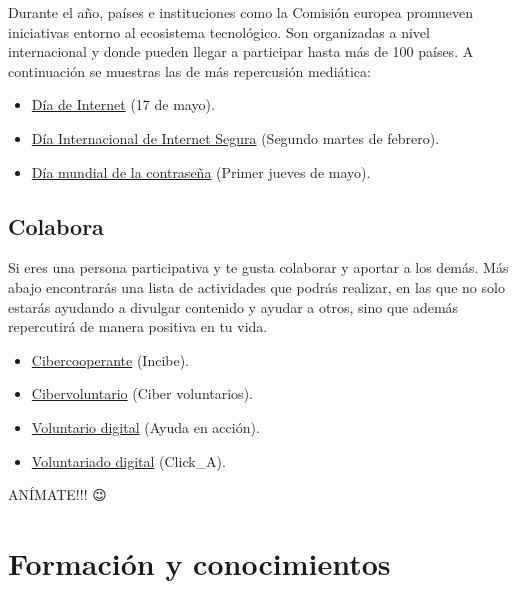 \documentclass[
  spanish,
  a4paper,
  openany]{book}
\begin{document}
Durante el año, países e instituciones como la Comisión europea promueven iniciativas entorno al ecosistema tecnológico. Son organizadas a nivel internacional y donde pueden llegar a participar hasta más de 100 países. A continuación se muestras las de más repercusión mediática:

\begin{itemize}
\item
  \href{https://es.wikipedia.org/wiki/Día_de_Internet}{Día de Internet} (17 de mayo).
\item
  \href{https://es.wikipedia.org/wiki/Día_Internacional_de_Internet_Segura}{Día Internacional de Internet Segura} (Segundo martes de febrero).
\item
  \href{https://es.wikipedia.org/wiki/Día_mundial_de_la_contraseña}{Día mundial de la contraseña} (Primer jueves de mayo).
\end{itemize}

\hypertarget{colabora}{%
\section{Colabora}\label{colabora}}

Si eres una persona participativa y te gusta colaborar y aportar a los demás. Más abajo encontrarás una lista de actividades que podrás realizar, en las que no solo estarás ayudando a divulgar contenido y ayudar a otros, sino que además repercutirá de manera positiva en tu vida.

\begin{itemize}
\item
  \href{https://www.incibe.es/cibercooperantes/quiero-ser-cibercooperante}{Cibercooperante} (Incibe).
\item
  \href{https://www.cibervoluntarios.org/}{Cibervoluntario} (Ciber voluntarios).
\item
  \href{https://ayudaenaccion.org/ong/colabora/voluntariado-digital/}{Voluntario digital} (Ayuda en acción).
\item
  \href{https://twitter.com/Clicka_CRE}{Voluntariado digital} (Click\_A).
\end{itemize}

ANÍMATE!!! 😉

\hypertarget{formaciuxf3n-y-conocimientos}{%
\chapter{Formación y conocimientos}\label{formaciuxf3n-y-conocimientos}}
\end{document}
